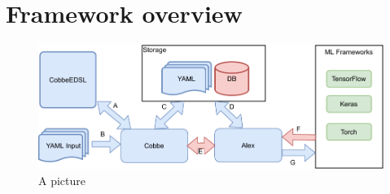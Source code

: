 \section{Framework overview}



\begin{figure}
  \includegraphics[width=\columnwidth]{pictures/framework_pic}
  \caption{A picture}
\end{figure}
